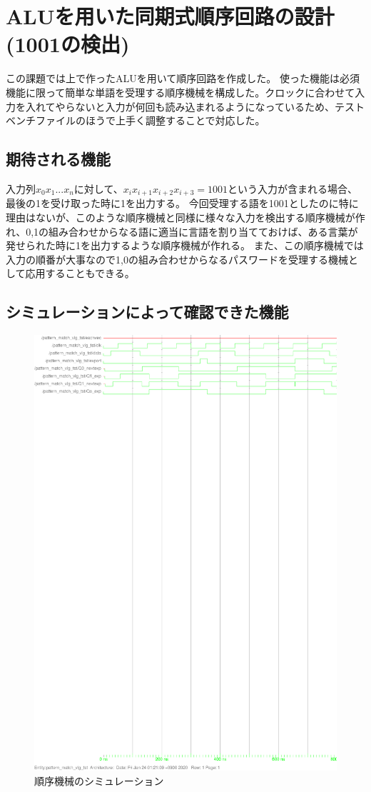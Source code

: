 \documentclass{jsarticle}
\begin{document}
\section{ALUを用いた同期式順序回路の設計(1001の検出)}
この課題では上で作ったALUを用いて順序回路を作成した。
使った機能は必須機能に限って簡単な単語を受理する順序機械を構成した。クロックに合わせて入力を入れてやらないと入力が何回も読み込まれるようになっているため、テストベンチファイルのほうで上手く調整することで対応した。
\subsection{期待される機能}
入力列$x_{0}x_{1}...x_{n}$に対して、$x_{i}x_{i+1}x_{i+2}x_{i+3} = 1001$という入力が含まれる場合、最後の1を受け取った時に1を出力する。
今回受理する語を1001としたのに特に理由はないが、このような順序機械と同様に様々な入力を検出する順序機械が作れ、0,1の組み合わせからなる語に適当に言語を割り当てておけば、ある言葉が発せられた時に1を出力するような順序機械が作れる。
また、この順序機械では入力の順番が大事なので1,0の組み合わせからなるパスワードを受理する機械として応用することもできる。
\subsection{シミュレーションによって確認できた機能}
\begin{figure}
    \caption{順序機械のシミュレーション}
  \includegraphics[scale=0.8]{pattern_match_1001.ps}
\end{figure}
\end{document}
